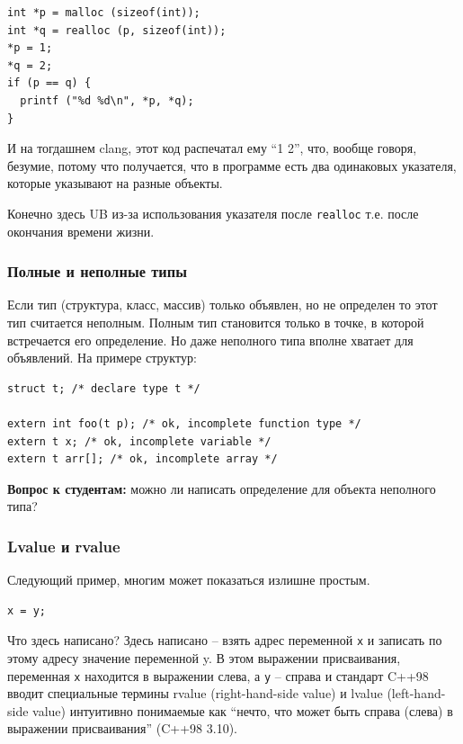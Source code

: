 \documentclass[a4paper,12pt,oneside]{article}
\newif\ifanswers
\begin{document}
\begin{lstlisting}
int *p = malloc (sizeof(int));
int *q = realloc (p, sizeof(int));
*p = 1;
*q = 2;
if (p == q) {
  printf ("%d %d\n", *p, *q);
}
\end{lstlisting}

И на тогдашнем clang, этот код распечатал ему ``1 2'', что, вообще говоря, безумие, потому что получается, что в программе есть два одинаковых указателя, которые указывают на разные объекты.

Конечно здесь UB из-за использования указателя после \lstinline!realloc! т.е. после окончания времени жизни.

\subsubsection{Полные и неполные типы}

Если тип (структура, класс, массив) только объявлен, но не определен то этот тип считается неполным. Полным тип становится только в точке, в которой встречается его определение. Но даже неполного типа вполне хватает для объявлений. На примере структур:

\begin{lstlisting}
struct t; /* declare type t */

extern int foo(t p); /* ok, incomplete function type */
extern t x; /* ok, incomplete variable */
extern t arr[]; /* ok, incomplete array */
\end{lstlisting}

\textbf{Вопрос к студентам:} можно ли написать определение для объекта неполного типа?

\ifanswers
Правильный ответ: конечно нет, так как неизвестно сколько памяти надо такому объекту. Но можно написать определение указателя на такой объект.
\fi

\subsubsection{Lvalue и rvalue}\label{LRvalues}

Следующий пример, многим может показаться излишне простым.

\begin{lstlisting}
x = y;
\end{lstlisting}

Что здесь написано? Здесь написано – взять адрес переменной \lstinline!x! и записать по этому адресу значение переменной y. В этом выражении присваивания, переменная \lstinline!x! находится в выражении слева, а \lstinline!y! -- справа и стандарт C++98 вводит специальные термины rvalue (right-hand-side value) и lvalue (left-hand-side value) интуитивно понимаемые как ``нечто, что может быть справа (слева) в выражении присваивания'' (C++98 3.10). 
\end{document}
